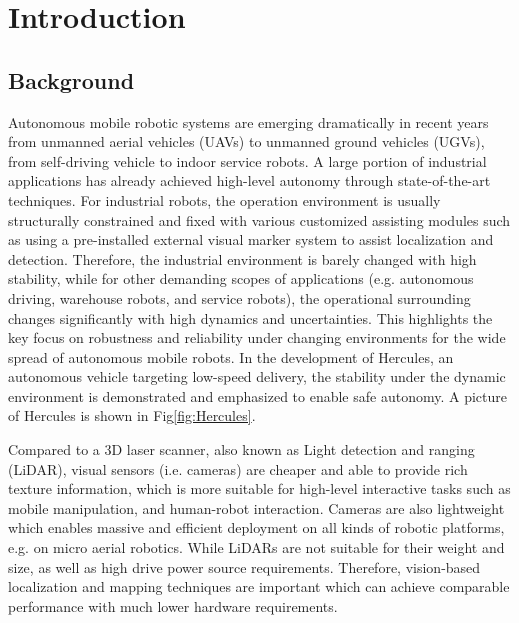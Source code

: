 \chapter{Introduction}
\section{Background}
Autonomous mobile robotic systems are emerging dramatically in recent years from
unmanned aerial vehicles (UAVs) to unmanned ground vehicles (UGVs), from self-driving
vehicle to indoor service robots. A large portion of industrial applications has
already achieved high-level autonomy through state-of-the-art techniques. 
For industrial robots, the operation environment is usually structurally constrained and fixed with various customized assisting modules such as using a pre-installed external visual marker system to assist localization and detection. 
Therefore, the industrial environment is barely changed with high stability, 
while for other demanding scopes of applications (e.g. autonomous driving, warehouse robots, and service robots), the operational surrounding changes significantly with high dynamics and uncertainties. This highlights the key focus on robustness and reliability under changing environments for the wide spread of autonomous mobile robots. In the development of Hercules\cite{liuhercules}, an autonomous vehicle targeting low-speed delivery, the stability under the dynamic environment is demonstrated and emphasized to enable safe autonomy. A picture of Hercules is shown in Fig\ref{fig:Hercules}.

Compared to a 3D laser scanner, also known as Light detection and ranging (LiDAR), 
visual sensors (i.e. cameras) are cheaper and able to provide rich
texture information, which is more suitable for high-level interactive tasks such
as mobile manipulation, and human-robot interaction. Cameras are also lightweight which enables massive and efficient deployment on all kinds of robotic platforms, e.g. on micro aerial robotics. While LiDARs are not suitable for their weight and size, as well as high drive power source requirements. Therefore, vision-based localization and mapping techniques are important which can achieve comparable performance with much lower hardware requirements.

